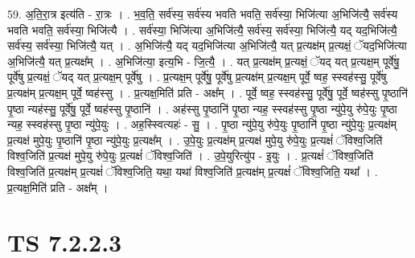 \documentclass[17pt]{extarticle}
\begin{document}
59. अ॒ति॒रा॒त्र इत्य॑ति - रा॒त्रः । . भ॒व॒ति॒ सर्व॑स्य॒ सर्व॑स्य भवति भवति॒ सर्व॑स्या॒ भिजि॑त्या अ॒भिजि॑त्यै॒ सर्व॑स्य भवति भवति॒ सर्व॑स्या॒ भिजि॑त्यै । . सर्व॑स्या॒ भिजि॑त्या अ॒भिजि॑त्यै॒ सर्व॑स्य॒ सर्व॑स्या॒ भिजि॑त्यै॒ यद् यद॒भिजि॑त्यै॒ सर्व॑स्य॒ सर्व॑स्या॒ भिजि॑त्यै॒ यत् । . अ॒भिजि॑त्यै॒ यद् यद॒भिजि॑त्या अ॒भिजि॑त्यै॒ यत् प्र॒त्यक्ष॑म् प्र॒त्यक्षं॒ ॅयद॒भिजि॑त्या अ॒भिजि॑त्यै॒ यत् प्र॒त्यक्ष᳚म् । . अ॒भिजि॑त्या॒ इत्य॒भि - जि॒त्यै॒ । . यत् प्र॒त्यक्ष॑म् प्र॒त्यक्षं॒ ॅयद् यत् प्र॒त्यक्ष॒म् पूर्वे॑षु॒ पूर्वे॑षु प्र॒त्यक्षं॒ ॅयद् यत् प्र॒त्यक्ष॒म् पूर्वे॑षु । . प्र॒त्यक्ष॒म् पूर्वे॑षु॒ पूर्वे॑षु प्र॒त्यक्ष॑म् प्र॒त्यक्ष॒म् पूर्वे॒ ष्वह॒ स्स्वह॑स्सु॒ पूर्वे॑षु प्र॒त्यक्ष॑म् प्र॒त्यक्ष॒म् पूर्वे॒ ष्वह॑स्सु । . प्र॒त्यक्ष॒मिति॑ प्रति - अक्ष᳚म् । . पूर्वे॒ ष्वह॒ स्स्वह॑स्सु॒ पूर्वे॑षु॒ पूर्वे॒ ष्वह॑स्सु पृ॒ष्ठानि॑ पृ॒ष्ठा न्यह॑स्सु॒ पूर्वे॑षु॒ पूर्वे॒ ष्वह॑स्सु पृ॒ष्ठानि॑ । . अह॑स्सु पृ॒ष्ठानि॑ पृ॒ष्ठा न्यह॒ स्स्वह॑स्सु पृ॒ष्ठा न्यु॑पे॒यु रु॑पे॒युः पृ॒ष्ठा न्यह॒ स्स्वह॑स्सु पृ॒ष्ठा न्यु॑पे॒युः । . अह॒स्स्वित्यहः॑ - सु॒ । . पृ॒ष्ठा न्यु॑पे॒यु रु॑पे॒युः पृ॒ष्ठानि॑ पृ॒ष्ठा न्यु॑पे॒युः प्र॒त्यक्ष॑म् प्र॒त्यक्ष॑ मुपे॒युः पृ॒ष्ठानि॑ पृ॒ष्ठा न्यु॑पे॒युः प्र॒त्यक्ष᳚म् । . उ॒पे॒युः प्र॒त्यक्ष॑म् प्र॒त्यक्ष॑ मुपे॒यु रु॑पे॒युः प्र॒त्यक्षं॑ ॅविश्व॒जिति॑ विश्व॒जिति॑ प्र॒त्यक्ष॑ मुपे॒यु रु॑पे॒युः प्र॒त्यक्षं॑ ॅविश्व॒जिति॑ । . उ॒पे॒युरित्यु॑प - इ॒युः । . प्र॒त्यक्षं॑ ॅविश्व॒जिति॑ विश्व॒जिति॑ प्र॒त्यक्ष॑म् प्र॒त्यक्षं॑ ॅविश्व॒जिति॒ यथा॒ यथा॑ विश्व॒जिति॑ प्र॒त्यक्ष॑म् प्र॒त्यक्षं॑ ॅविश्व॒जिति॒ यथा᳚ । . प्र॒त्यक्ष॒मिति॑ प्रति - अक्ष᳚म् । \newline
\pagebreak
{}

\section{ TS 7.2.2.3 }
\end{document}
